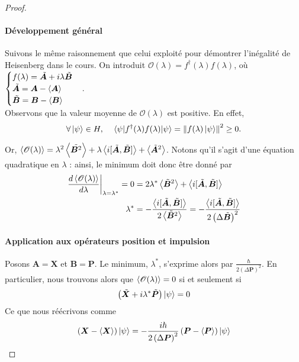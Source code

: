 \documentclass[11pt,oneside,a4paper]{article}
\newcommand{\h}{\ensuremath{\hbar}}
\newcommand\au[2]{\left.#1\right|_{#2}}
\begin{document}
\begin{proof}
\paragraph{Développement général}
Suivons le même raisonnement que celui exploité pour démontrer l'inégalité de Heisenberg dans le cours. On introduit $\mathcal{O}(\lambda) = f^\dagger(\lambda)f(\lambda)$, où $\begin{cases}
  f(\lambda) = \tilde{\bm{A}}+i\lambda\tilde{\bm{B}}\\
  \tilde{\bm{A}} = \bm{A}-\expval{\bm{A}}\\
  \tilde{\bm{B}} = \bm{B}-\expval{\bm{B}}
\end{cases}$.\\

Observons que la valeur moyenne de $\mathcal{O}(\lambda)$ est positive. En effet,
\begin{equation*}
  \forall\ket{\psi}\in H, \quad \expval{f^\dagger(\lambda)f(\lambda)}{\psi} = \norm{f(\lambda)\ket{\psi}}^2 \geq 0.
\end{equation*}

Or, $\expval{\mathcal{O}(\lambda)} = \lambda^2\expval{\tilde{\bm{B}^2}}+\lambda\expval{i[\tilde{\bm{A}},\tilde{\bm{B}}]}+\expval{\tilde{\bm{A}}^2}$. Notons qu'il s'agit d'une équation quadratique en $\lambda$ : ainsi, le minimum doit donc être donné par 
\begin{align}
  \au{\frac{d\expval{\mathcal{O}(\lambda)}}{d\lambda}}{\lambda=\lambda^*} = 0 &= 2\lambda^*\expval{\tilde{\bm{B}}^2}+\expval{i[\tilde{\bm{A}},\tilde{\bm{B}}]}\notag\\
  \lambda^* &= -\frac{\expval{i[\tilde{\bm{A}},\tilde{\bm{B}}]}}{2\expval{\tilde{\bm{B}}^2}} = -\frac{\expval{i[\tilde{\bm{A}},\tilde{\bm{B}}]}}{2\left(\Delta \tilde{\bm{B}}\right)^2}
\end{align}

\paragraph{Application aux opérateurs position et impulsion}
Posons $\bm{A} = \bm{X}$ et $\bm{B} = \bm{P}$. Le minimum, $\lambda^*$, s'exprime alors par $\frac{\h}{2\left(\Delta \bm{P}\right)^2}$. En particulier, nous trouvons alors que $\expval{\mathcal{O}(\lambda)} = 0$ si et seulement si 
\begin{align}
  \left(\tilde{\bm{X}}+i\lambda^*\tilde{\bm{P}}\right)\ket{\psi} = 0\notag
\end{align}
Ce que nous réécrivons comme
\begin{align}
  \left(\bm{X}-\expval{\bm{X}}\right)\ket{\psi} = -\frac{i\h}{2\left(\Delta \bm{P}\right)^2}\left(\bm{P}-\expval{\bm{P}}\right)\ket{\psi}\label{1.5}
\end{align}


\end{proof}
\end{document}
